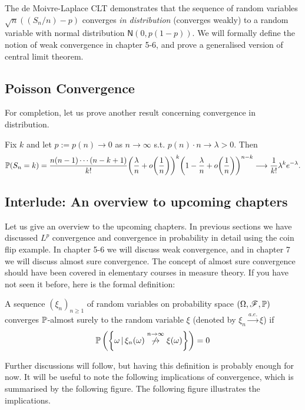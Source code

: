 The de Moivre-Laplace CLT demonstrates that the sequence of random variables $\sqrt{n}((S_n/n) - p)$ converges \textit{in distribution} (converges weakly) to a random variable with normal distribution $\mathsf{N}(0,p(1-p))$. We will formally define the notion of weak convergence in chapter 5-6, and prove a generalised version of central limit theorem.

\subsection{Poisson Convergence}
For completion, let us prove another result concerning convergence in distribution.
\begin{theorem}
Fix $k$ and let $p := p(n) \rightarrow 0$ as $n\rightarrow \infty$ s.t. $p(n) \cdot n \rightarrow \lambda >0$. Then 
\begin{equation}
    \mathbb{P}(S_n =k) = \frac{n(n-1)\cdots(n-k+1)}{k!} \bigg(\frac{\lambda}{n} + o\bigg(\frac{1}{n}\bigg)\bigg)^k \bigg(1 - \frac{\lambda}{n} + o\bigg(\frac{1}{n}\bigg) \bigg)^{n-k} \longrightarrow \frac{1}{k!} \lambda^k e^{-\lambda}.
\end{equation}
\end{theorem}

\subsection{Interlude: An overview to upcoming chapters}
Let us give an overview to the upcoming chapters. In previous sections we have discussed $L^p$ convergence and convergence in probability in detail using the coin flip example. In chapter 5-6 we will discuss weak convergence, and in chapter 7 we will discuss almost sure convergence. The concept of almost sure convergence should have been covered in elementary courses in measure theory. If you have not seen it before, here is the formal definition:

\begin{definition}
A sequence $(\xi_n)_{n\geq 1}$ of random variables on probability space $(\Omega,\mathcal{F},\mathbb{P})$ converges $\mathbb{P}$-almost surely to the random variable $\xi$ (denoted by $\xi_n \overset{a.e.}{\to} \xi$) if 
\begin{equation}
    \mathbb{P}\left( \left\{ \omega\,|\, \xi_n(\omega) \overset{n\to\infty}{\not\to} \xi(\omega) \right \} \right) = 0
\end{equation}
\end{definition}

Further discussions will follow, but having this definition is probably enough for now. It will be useful to note the following implications of convergence, which is summarised by the following figure. The following figure illustrates the implications.

